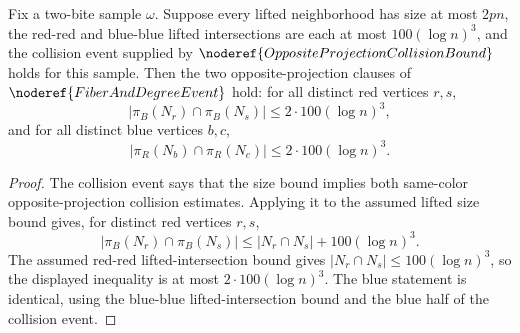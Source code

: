 \begin{helper}
Fix a two-bite sample \(\omega\).  Suppose every lifted neighborhood has
size at most \(2pn\), the red-red and blue-blue lifted intersections are each
at most \(100(\log n)^3\), and the collision event supplied by
\(\noderef{OppositeProjectionCollisionBound}\) holds for this sample.  Then
the two opposite-projection clauses of \(\noderef{FiberAndDegreeEvent}\) hold:
for all distinct red vertices \(r,s\),
\[
|\pi_B(N_r)\cap\pi_B(N_s)|\le 2\cdot 100(\log n)^3,
\]
and for all distinct blue vertices \(b,c\),
\[
|\pi_R(N_b)\cap\pi_R(N_c)|\le 2\cdot 100(\log n)^3.
\]
\end{helper}
\begin{proof}
The collision event says that the size bound implies both same-color
opposite-projection collision estimates.  Applying it to the assumed lifted
size bound gives, for distinct red vertices \(r,s\),
\[
|\pi_B(N_r)\cap\pi_B(N_s)|
\le |N_r\cap N_s|+100(\log n)^3.
\]
The assumed red-red lifted-intersection bound gives
\(|N_r\cap N_s|\le100(\log n)^3\), so the displayed inequality is at most
\(2\cdot100(\log n)^3\).  The blue statement is identical, using the blue-blue
lifted-intersection bound and the blue half of the collision event.
\end{proof}
